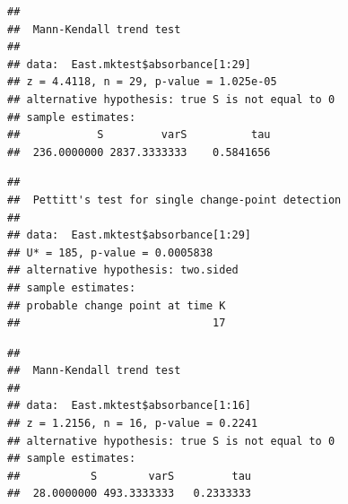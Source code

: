 \documentclass[12pt,]{article}
\newenvironment{Shaded}{\begin{snugshade}}{\end{snugshade}}
\newcommand{\KeywordTok}[1]{\textcolor[rgb]{0.13,0.29,0.53}{\textbf{#1}}}
\newcommand{\DecValTok}[1]{\textcolor[rgb]{0.00,0.00,0.81}{#1}}
\newcommand{\CommentTok}[1]{\textcolor[rgb]{0.56,0.35,0.01}{\textit{#1}}}
\newcommand{\OperatorTok}[1]{\textcolor[rgb]{0.81,0.36,0.00}{\textbf{#1}}}
\newcommand{\NormalTok}[1]{#1}
\begin{document}
\begin{verbatim}
## 
##  Mann-Kendall trend test
## 
## data:  East.mktest$absorbance[1:29]
## z = 4.4118, n = 29, p-value = 1.025e-05
## alternative hypothesis: true S is not equal to 0
## sample estimates:
##            S         varS          tau 
##  236.0000000 2837.3333333    0.5841656
\end{verbatim}

\begin{Shaded}
\end{Shaded}

\begin{verbatim}
## 
##  Pettitt's test for single change-point detection
## 
## data:  East.mktest$absorbance[1:29]
## U* = 185, p-value = 0.0005838
## alternative hypothesis: two.sided
## sample estimates:
## probable change point at time K 
##                              17
\end{verbatim}

\begin{Shaded}
\end{Shaded}

\begin{verbatim}
## 
##  Mann-Kendall trend test
## 
## data:  East.mktest$absorbance[1:16]
## z = 1.2156, n = 16, p-value = 0.2241
## alternative hypothesis: true S is not equal to 0
## sample estimates:
##           S        varS         tau 
##  28.0000000 493.3333333   0.2333333
\end{verbatim}

\begin{Shaded}
\end{Shaded}
\end{document}
